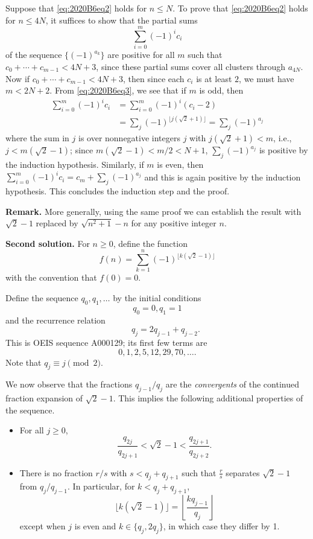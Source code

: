 \documentclass[amssymb,twocolumn,pra,10pt,aps]{revtex4-1}
\begin{document}
\begin{itemize}
Suppose that \eqref{eq:2020B6eq2} holds for $n\leq N$. To prove that \eqref{eq:2020B6eq2} holds for $n\leq 4N$, it suffices to show that the partial sums
\[
\sum_{i=0}^m (-1)^i c_i
\]
of the sequence $\{(-1)^{a_k}\}$ are positive for all $m$ such that $c_0+\cdots+c_{m-1}<4N+3$, since these partial sums cover all clusters through $a_{4N}$. Now if $c_0+\cdots+c_{m-1}<4N+3$, then since each $c_i$ is at least $2$, we must have $m<2N+2$. From \eqref{eq:2020B6eq3}, we see that if $m$ is odd, then
\begin{align*}
\sum_{i=0}^m (-1)^i c_i &= \sum_{i=0}^m (-1)^i (c_i-2) \\
&= \sum_j (-1)^{\lfloor j(\sqrt{2}+1)\rfloor} = \sum_j (-1)^{a_j}
\end{align*}
where the sum in $j$ is over nonnegative integers $j$ with $j(\sqrt{2}+1) < m$, i.e., $j <m(\sqrt{2}-1)$; since $m(\sqrt{2}-1)<m/2<N+1$,
$\sum_j (-1)^{a_j}$ is positive by the induction hypothesis. Similarly, if $m$ is even, then $\sum_{i=0}^m (-1)^i c_i = c_m+ \sum_j (-1)^{a_j}$ and this is again positive by the induction hypothesis. This concludes the induction step and the proof.

\noindent
\textbf{Remark.}
More generally, using the same proof we can establish the result with $\sqrt{2}-1$ replaced by $\sqrt{n^2+1}-n$ for any positive integer $n$.


\noindent
\textbf{Second solution.}
For $n \geq 0$, define the function 
\[
f(n) = \sum_{k=1}^n (-1)^{\lfloor k (\sqrt{2}-1) \rfloor}
\]
with the convention that $f(0) = 0$.

Define the sequence $q_0, q_1, \dots$ by the initial conditions
\[
q_0 = 0, q_1 = 1
\]
and the recurrence relation
\[
\qquad q_j = 2q_{j-1} + q_{j-2}.
\]
This is OEIS sequence A000129; its first few terms are
\[
0,1,2,5,12,29,70,\dots.
\]
Note that $q_j \equiv j \pmod{2}$.

We now observe that the fractions $q_{j-1}/q_j$ are the \emph{convergents} of the continued fraction expansion of $\sqrt{2}-1$.
This implies the following additional properties of the sequence.
\begin{itemize}
\item
For all $j \geq 0$, 
\[
\frac{q_{2j}}{q_{2j+1}} < \sqrt{2}-1 < \frac{q_{2j+1}}{q_{2j+2}}.
\]
\item
There is no fraction $r/s$ with $s < q_j + q_{j+1}$ such that
$\frac{r}{s}$ separates $\sqrt{2}-1$ from $q_j/q_{j-1}$. In particular, for $k < q_j + q_{j+1}$,
\[
\lfloor k (\sqrt{2}-1) \rfloor = \left\lfloor \frac{kq_{j-1}}{q_j} \right\rfloor
\]
except when $j$ is even and $k \in \{q_j, 2q_j\}$, in which case they differ by 1.
\end{itemize}


\end{itemize}
\end{document}
